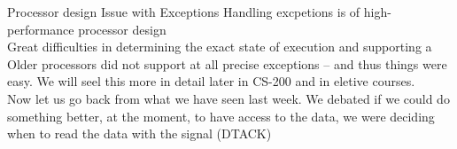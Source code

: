 \begin{parag}{Processor design Issue with Exceptions}%
\label{par:Processor design Issue with Exceptions}
Handling excpetions is  of high-performance processor design\\ Great difficulties in determining the exact state of execution and supporting a \\ 
Older processors did not support at all precise exceptions --  and thus things were easy. We will seel this more in detail later in CS-200 and in eletive courses.\\
Now let us go back from what we have seen last week.
We debated if we could do something better, at the moment, to have access to the data, we were deciding when to read the data with the signal (DTACK) 


\end{parag}
